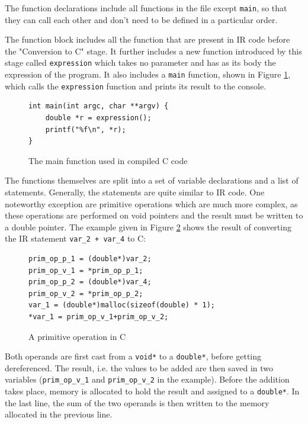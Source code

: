 \documentclass[11pt]{report}
\begin{document}
The function declarations include all functions in the file except \texttt{main}, so that they can call each other and don't need to be defined in a particular order.

The function block includes all the function that are present in IR code before the "Conversion to C" stage. It further includes a new function introduced by this stage called \texttt{expression} which takes no parameter and has as its body the expression of the program. It also includes a \texttt{main} function, shown in Figure \ref{icmm5}, which calls the \texttt{expression} function and prints its result to the console.

\begin{figure}[ht]
\begin{lstlisting}
int main(int argc, char **argv) {
    double *r = expression();
    printf("%f\n", *r);
}
\end{lstlisting}
\caption{The main function used in compiled C code}
\label{icmm5}
\end{figure}

The functions themselves are split into a set of variable declarations and a list of statements. Generally, the statements are quite similar to IR code. One noteworthy exception are primitive operations which are much more complex, as these operations are performed on void pointers and the result must be written to a double pointer. The example given in Figure \ref{icmm6} shows the result of converting the IR statement \texttt{var_2 + var_4} to C:

\begin{figure}[ht]
\begin{lstlisting}
prim_op_p_1 = (double*)var_2;
prim_op_v_1 = *prim_op_p_1;
prim_op_p_2 = (double*)var_4;
prim_op_v_2 = *prim_op_p_2;
var_1 = (double*)malloc(sizeof(double) * 1);
*var_1 = prim_op_v_1+prim_op_v_2;
\end{lstlisting}
\caption{A primitive operation in C}
\label{icmm6}
\end{figure}

Both operands are first cast from a \texttt{void*} to a \texttt{double*}, before getting dereferenced. The result, i.e. the values to be added are then saved in two variables (\texttt{prim_op_v_1} and \texttt{prim_op_v_2} in the example). Before the addition takes place, memory is allocated to hold the result and assigned to a \texttt{double*}. In the last line, the sum of the two operands is then written to the memory allocated in the previous line.
\end{document}
